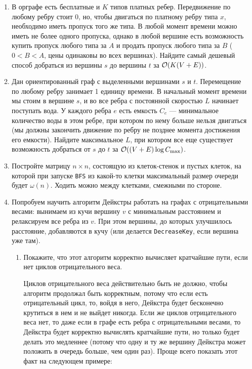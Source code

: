 \begin{enumerate}
  \item
    В орграфе есть бесплатные и $K$ типов платных ребер. Передвижение
    по любому ребру стоит $0$, но, чтобы двигаться по платному ребру
    типа $x$, необходимо иметь пропуск того же типа. В любой момент
    времени можно иметь не более одного пропуска, однако в любой
    вершине есть возможность купить пропуск любого типа за $A$ и
    продать пропуск любого типа за $B$ ($0 < B < A$, цены одинаковы
    во всех вершинах). Найдите самый дешевый способ добраться из вершины
    $s$ до вершины $t$ за $\mathcal{O}(K (V + E))$.

  \item
    Дан ориентированный граф с выделенными вершинами $s$ и $t$. Перемещение по любому ребру занимает 1 единицу времени.
    В начальный момент времени мы стоим в вершине $s$, и во все ребра с постоянной скоростью $L$ начинает поступать вода.
    У каждого ребра $e$ есть емкость $C_e$ --- минимальное количество воды в этом ребре, при котором по нему больше
    нельзя двигаться (мы должны закончить движение по ребру не позднее момента достижения его емкости). Найдите
    максимальное $L$, при котором все еще существует возможность добраться от $s$ до $t$ за $\mathcal{O}((V + E)\log{C_{\max}})$.

  \item
    Постройте матрицу $n \times n$, состоящую из клеток-стенок и пустых клеток,
    на которой при запуске \texttt{BFS} из какой-то клетки максимальный
    размер очереди будет $\omega(n)$. Ходить можно между клетками, смежными по стороне.

  \item
    Попробуем научить алгоритм Дейкстры работать на графах с отрицательными весами: вынимаем из кучи вершину $v$
    с минимальным расстоянием и релаксируем все ребра из $v$. При этом вершины, до которых улучшилось расстояние,
    добавляются в кучу (или делается \texttt{DecreaseKey}, если вершина уже там).
    \begin{enumerate}
      \item Покажите, что этот алгоритм корректно вычисляет кратчайшие пути, если нет циклов отрицательного веса.
      \begin{solution}
        Циклов отрицательного веса действительно быть не должно, чтобы алгоритм продолжал быть корректным, потому что если есть отрицательный цикл, то, войдя в него, Дейкстра будет бесконечно крутиться в нем и не выйдет никогда. Если же циклов отрицательного веса нет, то даже если в графе есть ребра с отрицательными весами, то Дейкстра будет корректно вычислять кратчайшие пути, но только будет делать это медленнее (потому что одну и ту же вершину Дейкстра может положить в очередь больше, чем один раз). Проще всего показать этот факт на следующем примере:
\end{solution}
\end{enumerate}
\end{enumerate}
